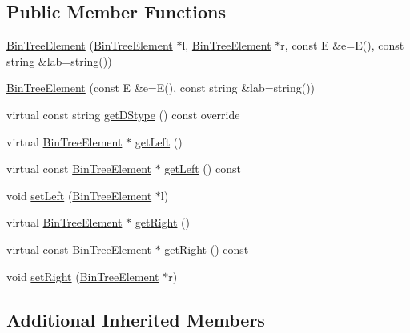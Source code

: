 \subsection*{Public Member Functions}
\begin{DoxyCompactItemize}
\item 
\hyperlink{classbridges_1_1_bin_tree_element_a1c60db90bda9ecd3f5a61b5f33f49173}{Bin\+Tree\+Element} (\hyperlink{classbridges_1_1_bin_tree_element}{Bin\+Tree\+Element} $\ast$l, \hyperlink{classbridges_1_1_bin_tree_element}{Bin\+Tree\+Element} $\ast$r, const E \&e=E(), const string \&lab=string())
\item 
\hyperlink{classbridges_1_1_bin_tree_element_a37d12669e5bfe13ebf230dd8fd2a5816}{Bin\+Tree\+Element} (const E \&e=E(), const string \&lab=string())
\item 
virtual const string \hyperlink{classbridges_1_1_bin_tree_element_a0a154f68ef0a58715e598a6ef92b9e59}{get\+D\+Stype} () const override
\item 
virtual \hyperlink{classbridges_1_1_bin_tree_element}{Bin\+Tree\+Element} $\ast$ \hyperlink{classbridges_1_1_bin_tree_element_a8367ce9c4eea814637edc2c56efbde25}{get\+Left} ()
\item 
virtual const \hyperlink{classbridges_1_1_bin_tree_element}{Bin\+Tree\+Element} $\ast$ \hyperlink{classbridges_1_1_bin_tree_element_a0841701bd7d4b444dafbbdfefed067a5}{get\+Left} () const
\item 
void \hyperlink{classbridges_1_1_bin_tree_element_a8f90f7f4c8da058ebfca64dd3728c50f}{set\+Left} (\hyperlink{classbridges_1_1_bin_tree_element}{Bin\+Tree\+Element} $\ast$l)
\item 
virtual \hyperlink{classbridges_1_1_bin_tree_element}{Bin\+Tree\+Element} $\ast$ \hyperlink{classbridges_1_1_bin_tree_element_a5751f2fe38e2364f68dc37939fce060f}{get\+Right} ()
\item 
virtual const \hyperlink{classbridges_1_1_bin_tree_element}{Bin\+Tree\+Element} $\ast$ \hyperlink{classbridges_1_1_bin_tree_element_aa01980f4be18f6c205580ea0376a0d07}{get\+Right} () const
\item 
void \hyperlink{classbridges_1_1_bin_tree_element_a0131f6ecefc7f68c6502d97292ea43bf}{set\+Right} (\hyperlink{classbridges_1_1_bin_tree_element}{Bin\+Tree\+Element} $\ast$r)
\end{DoxyCompactItemize}
\subsection*{Additional Inherited Members}


